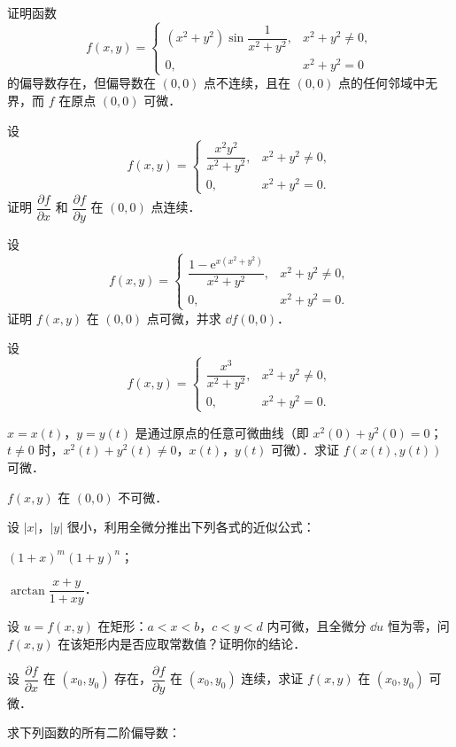 \begin{xiti}
\item 证明函数
\[
f(x,y)=\begin{cases}
(x^{2}+y^{2})\sin\dfrac{1}{x^{2}+y^{2}}, & x^{2}+y^{2}\neq 0,\\
0, & x^{2}+y^{2}=0
\end{cases}
\]
的偏导数存在，但偏导数在 $(0,0)$ 点不连续，且在 $(0,0)$ 点的任何邻域中无界，而 $f$ 在原点 $(0,0)$ 可微．
\item 设
\[
f(x,y)=\begin{cases}
\dfrac{x^{2}y^{2}}{x^{2}+y^{2}}, & x^{2}+y^{2}\neq 0,\\
0, & x^{2}+y^{2}=0.
\end{cases}
\]
证明 $\dfrac{\partial f}{\partial x}$ 和 $\dfrac{\partial f}{\partial y}$ 在 $(0,0)$ 点连续．
\item 设
\[
f(x,y)=\begin{cases}
\dfrac{1-\mathrm{e}^{x(x^{2}+y^{2})}}{x^{2}+y^{2}}, & x^{2}+y^{2}\neq 0,\\
0, & x^{2}+y^{2}=0.
\end{cases}
\]
证明 $f(x,y)$ 在 $(0,0)$ 点可微，并求 $\dd f(0,0)$．
\item 设
\[
f(x,y)=\begin{cases}
\dfrac{x^{3}}{x^{2}+y^{2}}, & x^{2}+y^{2}\neq 0,\\
0, & x^{2}+y^{2}=0.
\end{cases}
\]
\begin{ziti}
\item $x=x(t)$，$y=y(t)$ 是通过原点的任意可微曲线（即 $x^{2}(0)+y^{2}(0)=0$；$t\neq 0$ 时，$x^{2}(t)+y^{2}(t)\neq 0$，$x(t)$，$y(t)$ 可微）．求证 $f(x(t),y(t))$ 可微．
\item $f(x,y)$ 在 $(0,0)$ 不可微．
\end{ziti}
\item 设 $\left|x\right|$，$\left|y\right|$ 很小，利用全微分推出下列各式的近似公式：
\begin{ziti}
\item $(1+x)^{m}(1+y)^{n}$；
\item $\arctan\dfrac{x+y}{1+xy}$．
\end{ziti}
\item 设 $u=f(x,y)$ 在矩形：$a<x<b$，$c<y<d$ 内可微，且全微分 $\dd u$ 恒为零，问 $f(x,y)$ 在该矩形内是否应取常数值？证明你的结论．
\item 设 $\dfrac{\partial f}{\partial x}$ 在 $(x_{0},y_{0})$ 存在，$\dfrac{\partial f}{\partial y}$ 在 $(x_{0},y_{0})$ 连续，求证 $f(x,y)$ 在 $(x_{0},y_{0})$ 可微．
\item 求下列函数的所有二阶偏导数：

\end{xiti}
